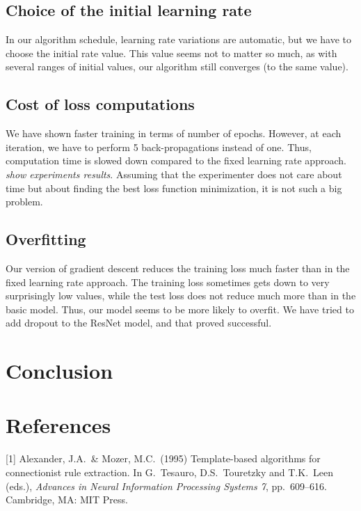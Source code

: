 \documentclass{article}
\begin{document}
  \subsection{Choice of the initial learning rate}
  
  In our algorithm schedule, learning rate variations are automatic, but we have to choose the initial rate value. This value seems not to matter so much, as with several ranges of initial values, our algorithm still converges (to the same value).
  
  \subsection{Cost of loss computations}
  
  We have shown faster training in terms of number of epochs. However, at each iteration, we have to perform 5 back-propagations instead of one. Thus, computation time is slowed down compared to the fixed learning rate approach. \emph{show experiments results}. Assuming that the experimenter does not care about time but about finding the best loss function minimization, it is not such a big problem.
  
  \subsection{Overfitting}
  
  Our version of gradient descent reduces the training loss much faster than in the fixed learning rate approach. The training loss sometimes gets down to very surprisingly low values, while the test loss does not reduce much more than in the basic model. Thus, our model seems to be more likely to overfit. We have tried to add dropout to the ResNet model, and that proved successful. 
  
  \section{Conclusion}
  
  
  \section*{References}
  
  \medskip
  
  \small
  
  [1] Alexander, J.A.\ \& Mozer, M.C.\ (1995) Template-based algorithms
  for connectionist rule extraction. In G.\ Tesauro, D.S.\ Touretzky and
  T.K.\ Leen (eds.), {\it Advances in Neural Information Processing
    Systems 7}, pp.\ 609--616. Cambridge, MA: MIT Press.
  
  
  
\end{document}
